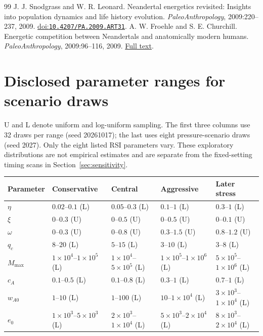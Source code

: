 \documentclass[12pt,a4paper]{article}
\theoremstyle{remark}
\begin{document}
\begin{thebibliography}{99}
 J. J. Snodgrass and W. R. Leonard. Neandertal energetics revisited: Insights into population dynamics and life history evolution. \emph{PaleoAnthropology}, 2009:220--237, 2009. \href{https://doi.org/10.4207/PA.2009.ART31}{doi:\nolinkurl{10.4207/PA.2009.ART31}}.
 A. W. Froehle and S. E. Churchill. Energetic competition between Neandertals and anatomically modern humans. \emph{PaleoAnthropology}, 2009:96--116, 2009. \href{https://paleoanthro.org/media/journal/content/PA20090096.pdf}{Full text}.
\end{thebibliography}

\appendix
\noindent\begin{minipage}{\linewidth}
\section{Disclosed parameter ranges for scenario draws}\label{app:ranges}
U and L denote uniform and log-uniform sampling. The first three columns use 32 draws per range (seed 20261017); the last uses eight pressure-scenario draws (seed 2027). Only the eight listed RSI parameters vary. These exploratory distributions are not empirical estimates and are separate from the fixed-setting timing scans in Section~\ref{sec:sensitivity}.

\begingroup
\centering\footnotesize
{}\label{tab:ranges}
\begin{tabular}{@{}lllll@{}}\toprule
Parameter & Conservative & Central & Aggressive & Later stress\\\midrule
$\eta$ & $0.02$--$0.1$ (L) & $0.05$--$0.3$ (L) & $0.1$--$1$ (L) & $0.3$--$1$ (L)\\
$\xi$ & $0$--$0.3$ (U) & $0$--$0.5$ (U) & $0$--$0.5$ (U) & $0$--$0.1$ (U)\\
$\omega$ & $0$--$0.3$ (U) & $0$--$0.8$ (U) & $0.3$--$1.5$ (U) & $0.8$--$1.2$ (U)\\
$q_c$ & $8$--$20$ (L) & $5$--$15$ (L) & $3$--$10$ (L) & $3$--$8$ (L)\\
$M_{\max}$ & $1\!\times\!10^{4}$--$1\!\times\!10^{5}$ (L) & $1\!\times\!10^{4}$--$5\!\times\!10^{5}$ (L) & $1\!\times\!10^{5}$--$1\!\times\!10^{6}$ (L) & $5\!\times\!10^{5}$--$1\!\times\!10^{6}$ (L)\\
$c_A$ & $0.1$--$0.5$ (L) & $0.1$--$0.8$ (L) & $0.3$--$1$ (L) & $0.7$--$1$ (L)\\
$w_{A0}$ & $1$--$10$ (L) & $1$--$100$ (L) & $10$--$1\!\times\!10^{4}$ (L) & $3\!\times\!10^{3}$--$1\!\times\!10^{4}$ (L)\\
$e_0$ & $1\!\times\!10^{3}$--$5\!\times\!10^{3}$ (L) & $2\!\times\!10^{3}$--$1\!\times\!10^{4}$ (L) & $5\!\times\!10^{3}$--$2\!\times\!10^{4}$ (L) & $8\!\times\!10^{3}$--$2\!\times\!10^{4}$ (L)\\
\bottomrule\end{tabular}

\par
\endgroup
\end{minipage}
\end{document}
